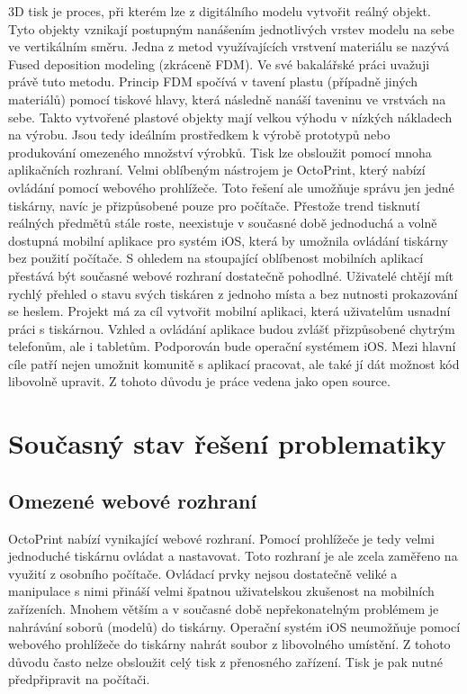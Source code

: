 \documentclass[czech]{article}
\begin{document}
3D tisk je proces, při kterém lze z digitálního modelu vytvořit reálný objekt. Tyto objekty vznikají postupným nanášením jednotlivých vrstev modelu na sebe ve vertikálním směru. Jedna z metod využívajících vrstvení materiálu se nazývá Fused deposition modeling (zkráceně FDM). Ve své bakalářské práci uvažuji právě tuto metodu. Princip FDM spočívá v tavení plastu (případně jiných materiálů) pomocí tiskové hlavy, která následně nanáší taveninu ve vrstvách na sebe. Takto vytvořené plastové objekty mají velkou výhodu v nízkých nákladech na výrobu. Jsou tedy ideálním prostředkem k výrobě prototypů nebo produkování omezeného množství výrobků. Tisk lze obsloužit pomocí mnoha aplikačních rozhraní. Velmi oblíbeným nástrojem je OctoPrint, který nabízí ovládání pomocí webového prohlížeče. Toto řešení ale umožňuje správu jen jedné tiskárny, navíc je přizpůsobené pouze pro počítače. Přestože trend tisknutí reálných předmětů stále roste, neexistuje v současné době jednoduchá a volně dostupná mobilní aplikace pro systém iOS, která by umožnila ovládání tiskárny bez použití počítače. S ohledem na stoupající oblíbenost mobilních aplikací přestává být současné webové rozhraní dostatečně pohodlné. Uživatelé chtějí mít rychlý přehled o stavu svých tiskáren z jednoho místa a bez nutnosti prokazování se heslem. Projekt má za cíl vytvořit mobilní aplikaci, která uživatelům usnadní práci s tiskárnou. Vzhled a ovládání aplikace budou zvlášť přizpůsobené chytrým telefonům, ale i tabletům. Podporován bude operační systémem iOS. Mezi hlavní cíle patří nejen umožnit komunitě s aplikací pracovat, ale také jí dát možnost kód libovolně upravit. Z tohoto důvodu je práce vedena jako open source.

\section{Současný stav řešení problematiky}

\subsection{Omezené webové rozhraní}

OctoPrint nabízí vynikající webové rozhraní. Pomocí prohlížeče je tedy velmi jednoduché tiskárnu ovládat a nastavovat. Toto rozhraní je ale zcela zaměřeno na využití z osobního počítače. Ovládací prvky nejsou dostatečně veliké a manipulace s nimi přináší velmi špatnou uživatelskou zkušenost na mobilních zařízeních. Mnohem větším a v současné době nepřekonatelným problémem je nahrávání soborů (modelů) do tiskárny. Operační systém iOS neumožňuje pomocí webového prohlížeče do tiskárny nahrát soubor z libovolného umístění. Z tohoto důvodu často nelze obsloužit celý tisk z přenosného zařízení. Tisk je pak nutné předpřipravit na počítači.
\end{document}
